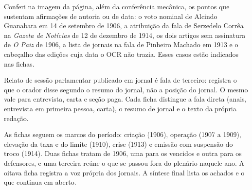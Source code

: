 Conferi na imagem da página, além da conferência mecânica, os pontos que
sustentam afirmações de autoria ou de data: o voto nominal de Alcindo Guanabara
em 14 de setembro de 1906, a atribuição da fala de Serzedelo Corrêa na
\textit{Gazeta de Notícias} de 12 de dezembro de 1914, os dois artigos sem
assinatura de \textit{O Paiz} de 1906, a lista de jornais na fala de Pinheiro
Machado em 1913 e o cabeçalho das edições cuja data o OCR não trazia. Esses
casos estão indicados nas fichas.


Relato de sessão parlamentar publicado em jornal é fala de terceiro: registra o
que o orador disse segundo o resumo do jornal, não a posição do jornal. O mesmo
vale para entrevista, carta e seção paga. Cada ficha distingue a fala direta
(anais, entrevista em primeira pessoa, carta), o resumo de jornal e o texto da
própria redação.


As fichas seguem os marcos do período: criação (1906), operação (1907 a 1909),
elevação da taxa e do limite (1910), crise (1913) e emissão com suspensão do
troco (1914). Duas fichas tratam de 1906, uma para os vencidos e outra para os
defensores, e uma terceira reúne o que se passou fora do plenário naquele ano.
A oitava ficha registra a voz própria dos jornais. A síntese final lista os
achados e o que continua em aberto.
